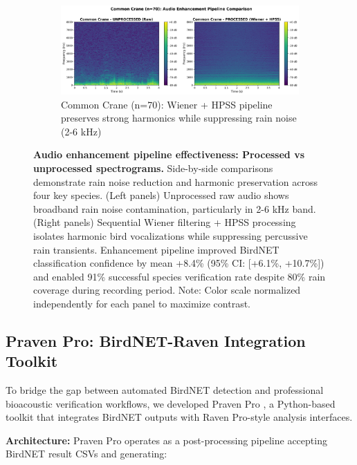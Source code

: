 \documentclass[twocolumn]{article}
\begin{document}
\begin{figure}[p]
\vspace{0.8cm}

\begin{subfigure}{0.78\textwidth}
\centering
\includegraphics[width=\textwidth]{figures/comparison_common_crane.png}
\caption{Common Crane (n=70): Wiener + HPSS pipeline preserves strong harmonics while suppressing rain noise (2-6 kHz)}
\end{subfigure}

\caption{\textbf{Audio enhancement pipeline effectiveness: Processed vs unprocessed spectrograms.} Side-by-side comparisons demonstrate rain noise reduction and harmonic preservation across four key species. (Left panels) Unprocessed raw audio shows broadband rain noise contamination, particularly in 2-6 kHz band. (Right panels) Sequential Wiener filtering + HPSS processing isolates harmonic bird vocalizations while suppressing percussive rain transients. Enhancement pipeline improved BirdNET classification confidence by mean +8.4\% (95\% CI: [+6.1\%, +10.7\%]) and enabled 91\% successful species verification rate despite 80\% rain coverage during recording period. Note: Color scale normalized independently for each panel to maximize contrast.}
\label{fig:processing_comparison}
\end{figure}

\subsection{Praven Pro: BirdNET-Raven Integration Toolkit}

To bridge the gap between automated BirdNET detection and professional bioacoustic verification workflows, we developed Praven Pro \citep{Redpath2025}, a Python-based toolkit that integrates BirdNET outputs with Raven Pro-style analysis interfaces.

\textbf{Architecture:} Praven Pro operates as a post-processing pipeline accepting BirdNET result CSVs and generating:
\end{document}
